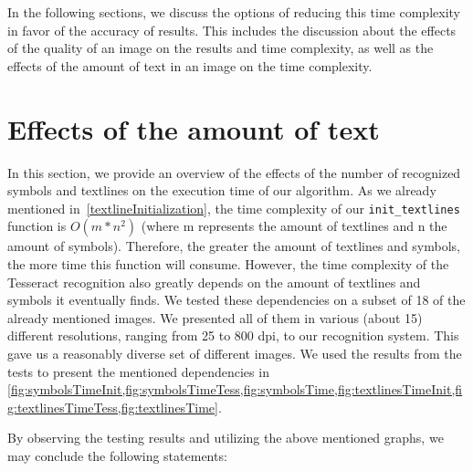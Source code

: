 In the following sections, we discuss the options of reducing this time complexity in favor of the accuracy of results. This includes the discussion about the effects of the quality of an image on the results and time complexity, as well as the effects of the amount of text in an image on the time complexity.

\section{Effects of the amount of text} \label{resultsEffectsOfText}

In this section, we provide an overview of the effects of the number of recognized symbols and textlines on the execution time of our algorithm. As we already mentioned in~\cref{textlineInitialization}, the time complexity of our \texttt{init\_textlines} function is $O(m*n^2)$ (where m represents the amount of textlines and n the amount of symbols). Therefore, the greater the amount of textlines and symbols, the more time this function will consume. However, the time complexity of the Tesseract recognition also greatly depends on the amount of textlines and symbols it eventually finds. We tested these dependencies on a subset of 18 of the already mentioned images. We presented all of them in various (about 15) different resolutions, ranging from 25 to 800 dpi, to our recognition system. This gave us a reasonably diverse set of different images. We used the results from the tests to present the mentioned dependencies in \cref{fig:symbolsTimeInit,fig:symbolsTimeTess,fig:symbolsTime,fig:textlinesTimeInit,fig:textlinesTimeTess,fig:textlinesTime}.

By observing the testing results and utilizing the above mentioned graphs, we may conclude the following statements:

